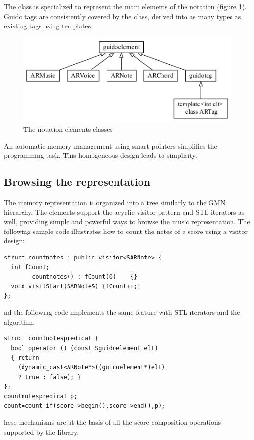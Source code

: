 \documentclass{article}
\newenvironment{contentsmall}	{\small}
\newcommand{\code}[1]	{{\small \texttt{#1}}}
\begin{document}
The   class is specialized to represent the main elements of the notation (figure \ref{classes}). Guido tags are consistently covered by the  class, derived into as many types as existing tags using templates.
\begin{figure}[htbp]
	\begin{center}
	\includegraphics[width=\columnwidth]{rsrc/elements}
	\caption{The notation elements classes}
	\label{classes}
	\end{center}
\end{figure}

An automatic memory management using smart pointers simplifies the programming task. This homogeneous design leads to simplicity.

\subsection{Browsing the representation}

The memory representation is organized into a tree similarly to the GMN hierarchy. The elements support the acyclic visitor pattern \cite{alex01} and STL iterators as well, providing simple and powerful ways to browse the music representation. The following sample code illustrates how to count the notes of a score using a visitor design: 
\begin{contentsmall} 
\begin{verbatim} 
struct countnotes : public visitor<SARNote> {
  int fCount;
        countnotes() : fCount(0)	{}
  void visitStart(SARNote&) {fCount++;}
};
\end{verbatim} 
\end{contentsmall}
And the following code implements the same feature with STL iterators and the  algorithm.
\begin{contentsmall} 
\begin{verbatim} 
struct countnotespredicat {
  bool operator () (const Sguidoelement elt) 
  { return 
  	(dynamic_cast<ARNote*>((guidoelement*)elt) 
    ? true : false); }
};
countnotespredicat p;
count=count_if(score->begin(),score->end(),p);
\end{verbatim} 
\end{contentsmall}
These mechanisms are at the basis of all the score composition operations supported by the library.
\end{document}

